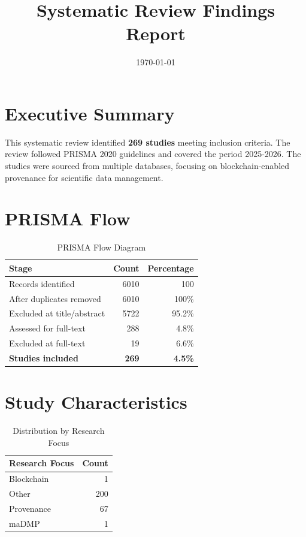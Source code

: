 \documentclass{article}
\title{
Systematic Review Findings Report
}
\date{\today}
\begin{document}
\maketitle

\section{Executive Summary}

This systematic review identified \textbf{269 studies} meeting inclusion criteria. 
The review followed PRISMA 2020 guidelines and covered the period 2025-2026. 
The studies were sourced from multiple databases, focusing on blockchain-enabled provenance for scientific data management.

\section{PRISMA Flow}

\begin{table}[htbp]
\centering
\caption{PRISMA Flow Diagram}
\begin{tabular}{lrr}
\toprule
Stage & Count & Percentage \\
\midrule
Records identified & 6010 & 100\\%
After duplicates removed & 6010 & 100\% \\
Excluded at title/abstract & 5722 & 95.2\% \\
Assessed for full-text & 288 & 4.8\% \\
Excluded at full-text & 19 & 6.6\% \\
\textbf{Studies included} & \textbf{269} & \textbf{4.5\%} \\
\bottomrule
\end{tabular}
\end{table}

\section{Study Characteristics}

\begin{table}[htbp]
\centering
\caption{Distribution by Research Focus}
\begin{tabular}{lr}
\toprule
Research Focus & Count \\
\midrule
Blockchain & 1 \\
Other & 200 \\
Provenance & 67 \\
maDMP & 1 \\
\bottomrule
\end{tabular}
\end{table}
\end{document}
